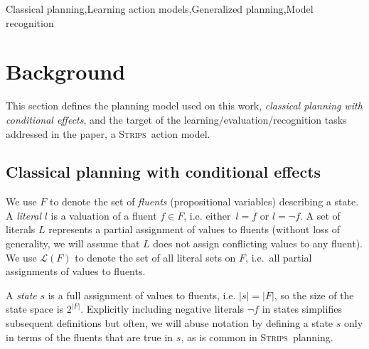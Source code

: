 \documentclass[3p,times]{elsarticle}
\newcommand{\strips}{\textsc{Strips}}     %
\begin{document}
\begin{frontmatter}
\begin{keyword}
Classical planning\sep Learning action models\sep Generalized planning\sep Model recognition

\end{keyword}

\end{frontmatter}












\section{Background}
\label{sec:Section3}
This section defines the planning model used on this work, {\em classical planning with conditional effects}, and the target of the learning/evaluation/recognition tasks addressed in the paper, a \strips\ action model.

\subsection{Classical planning with conditional effects}
We use $F$ to denote the set of {\em fluents} (propositional variables) describing a state. A {\em literal} $l$ is a valuation of a fluent $f\in F$, i.e. either~$l=f$ or $l=\neg f$. A set of literals $L$ represents a partial assignment of values to fluents (without loss of generality, we will assume that $L$ does not assign conflicting values to any fluent). We use $\mathcal{L}(F)$ to denote the set of all literal sets on $F$, i.e.~all partial assignments of values to fluents.

A {\em state} $s$ is a full assignment of values to fluents, i.e. $|s|=|F|$, so the size of the state space is $2^{|F|}$. Explicitly including negative literals $\neg f$ in states simplifies subsequent definitions but often, we will abuse notation by defining a state $s$ only in terms of the fluents that are true in $s$, as is common in \strips\ planning.
\end{document}

